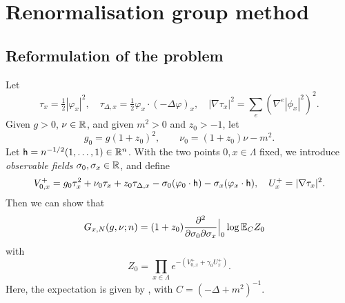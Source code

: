 \chapter{Renormalisation group method}





\section{Reformulation of the problem}

Let
\begin{equation}
\tau_x = \tfrac{1}{2} |\varphi_x|^2,
  \quad
\tau_{\Delta,x} = \tfrac{1}{2} \varphi_x \cdot (-\Delta \varphi)_x,
  \quad
|\nabla\tau_x|^2 = \sum_e (\nabla^e |\phi_x|^2)^2.
\end{equation}
Given $g>0$, $\nu\in {\mathbb R}$, and  given $m^2>0$ and $z_0 >-1$, let
\begin{equation}
  \label{e:gg0}
  g_0 = g(1+z_0)^2, \quad \quad
  \nu_0 = (1+z_0)\nu-m^2.
\end{equation}
Let ${\sf h} = n^{-1/2}(1, \ldots, 1) \in {\mathbb R}^n$.
With the two points $0,x\in \Lambda$ fixed,
we introduce \emph{observable fields} $\sigma_0, \sigma_x \in {\mathbb R}$, and define
\begin{equation}
\label{e:V0def}
  V^+_{0,x}
  = g_0\tau_x^2 + \nu_0 \tau_x + z_0 \tau_{\Delta,x} -
    \sigma_0 (\varphi_{0} \cdot {\sf h})
    - \sigma_x (\varphi_{x} \cdot {\sf h}),
  \quad
  U^+_x = |\nabla \tau_x|^2.
\end{equation}
Then we can show that
\begin{align}
\label{e:generating-fn}
    G_{x,N}(g, \nu; n)
    &=
    (1+z_0)
    \frac{\partial^2 }{\partial \sigma_0  \partial \sigma_x }
    \Big|_{0}
    \log
    \mathbb{E}_C  Z_0
\end{align}
with
\begin{equation}
\label{e:Z0def}
  Z_0
  =
  \prod_{x\in \Lambda} e^{-(V^+_{0,x} + \gamma_0 U^+_x)}.
\end{equation}
Here, the expectation is given by , with $C = (-\Delta + m^2)^{-1}$.

